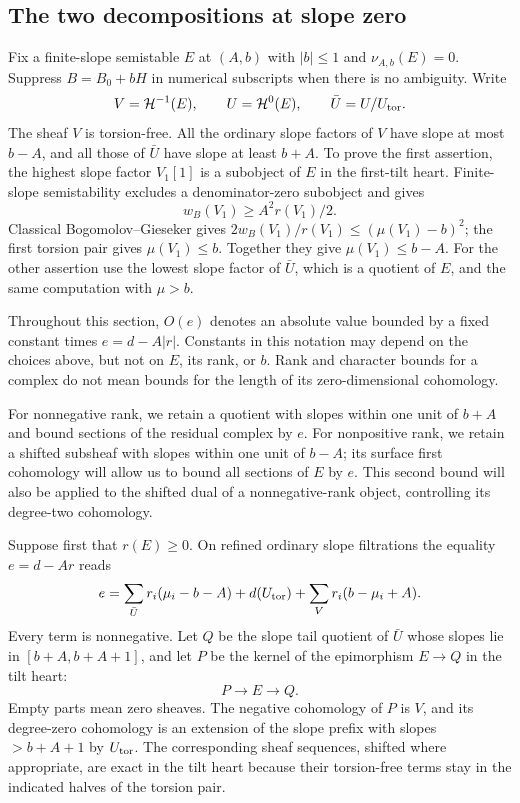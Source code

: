 \subsection{The two decompositions at slope zero}

Fix a finite-slope semistable $E$ at $(A,b)$ with $|b|\leq1$ and
$\nu_{A,b}(E)=0$.  Suppress $B=B_0+bH$ in numerical subscripts when
there is no ambiguity.  Write
\[
 V=\mathcal H^{-1}(E),\qquad U=\mathcal H^0(E),\qquad
 \bar U=U/U_{\rm tor}.
\]
The sheaf $V$ is torsion-free.  All the ordinary slope factors of
$V$ have slope at most $b-A$, and all those of $\bar U$ have slope
at least $b+A$.  To prove the first assertion, the highest slope
factor $V_1[1]$ is a subobject of $E$ in the first-tilt heart.
Finite-slope semistability excludes a denominator-zero subobject
and gives
\[
 w_B(V_1)\geq A^2r(V_1)/2.
\]
Classical Bogomolov--Gieseker gives
$2w_B(V_1)/r(V_1)\leq(\mu(V_1)-b)^2$; the first torsion pair gives
$\mu(V_1)\leq b$.  Together they give $\mu(V_1)\leq b-A$.
For the other assertion use the lowest slope factor of $\bar U$,
which is a quotient of $E$, and the same computation with
$\mu>b$.

Throughout this section, $O(e)$ denotes an absolute value bounded
by a fixed constant times $e=d-A|r|$.  Constants in this notation
may depend on the choices above, but not on $E$, its rank, or $b$.
Rank and character bounds for a complex do not mean bounds for the
length of its zero-dimensional cohomology.

For nonnegative rank, we retain a quotient with slopes within one
unit of $b+A$ and bound sections of the residual complex by $e$.
For nonpositive rank, we retain a shifted subsheaf with slopes
within one unit of $b-A$; its surface first cohomology will allow us to
bound all sections of $E$ by $e$.  This second bound will also be
applied to the shifted dual of a nonnegative-rank object, controlling
its degree-two cohomology.

Suppose first that $r(E)\geq0$.  On refined ordinary slope
filtrations the equality $e=d-Ar$ reads
\begin{equation}\label{eq:positive-excess}
 e=\sum_{\bar U}r_i(\mu_i-b-A)
   +d(U_{\rm tor})+\sum_Vr_i(b-\mu_i+A).
\end{equation}
Every term is nonnegative.  Let $Q$ be the slope tail quotient of
$\bar U$ whose slopes lie in $[b+A,b+A+1]$, and let $P$ be the kernel
of the epimorphism $E\to Q$ in the tilt heart:
\begin{equation}\label{eq:positive-residual-triangle}
 P\longrightarrow E\longrightarrow Q.
\end{equation}
Empty parts mean zero sheaves.  The negative cohomology of $P$ is
$V$, and its degree-zero cohomology is an extension of the slope
prefix with slopes $>b+A+1$ by $U_{\rm tor}$.  The corresponding
sheaf sequences, shifted where appropriate, are exact in the tilt
heart because their torsion-free terms stay in the indicated halves
of the torsion pair.

